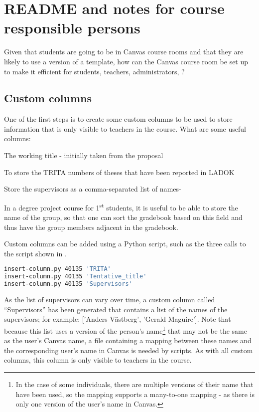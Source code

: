 
\chapter{README and notes for course responsible persons}
\label{ch:readme_course_responible}

Given that students are going to be in Canvas course rooms and that they are likely to use a version of a template, how can the Canvas course room be set up to make it efficient for students, teachers, administrators, \etc?

\section{Custom columns}
\label{sec:CRcustomeCOlumns}

One of the first steps is to create some custom columns to be used to store information that is only visible to teachers in the course. What are some useful columns:
\begin{description}[labelwidth =\widthof{\textbf{Tentative\_title}}, leftmargin = !]
\item[Tentative\_title]  The working title - initially taken from the proposal

\item[TRITA] To store the TRITA numbers of theses that have been reported in LADOK

\item[Supervisors] Store the supervisors as a comma-separated list of names-

\item[Group] In a degree project course for 1\textsuperscript{st} students, it is useful to be able to store the name of the group, so that one can sort the gradebook based on this field and thus have the group members adjacent in the gradebook.
\end{description}

Custom columns can be added using a Python script, such as the three calls to the script shown in .
\begin{lstlisting}[basicstyle=\footnotesize, language={bash}, columns=fullflexible, showstringspaces=false, caption={Adding custom columns to the gradebook},label=lst:CRaddingCustomCOlumns]
insert-column.py 40135 'TRITA'
insert-column.py 40135 'Tentative_title'
insert-column.py 40135 'Supervisors'
\end{lstlisting}

As the list of supervisors can vary over time, a custom column called ``Supervisors'' has been generated that contains a list of the names of the supervisors; for example: ['Anders Västberg', 'Gerald Maguire']. Note that because this list uses a version of the person's name\footnote{In the case of some individuals, there are multiple versions of their name that have been used, so the mapping supports a many-to-one mapping - as there is only one version of the user's name in Canvas.} that may not be the same as the user's Canvas name, a file containing a mapping between these names and the corresponding user's name in Canvas is needed by scripts. As with all custom columns, this column is only visible to teachers in the course.



